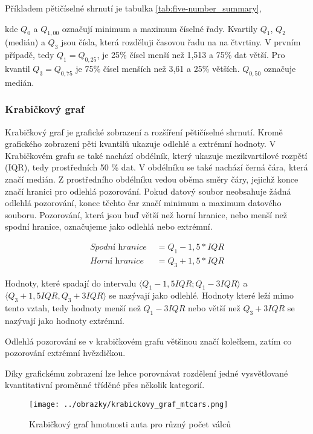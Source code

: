 Příkladem pětičíselné shrnutí je tabulka \ref{tab:five-number_summary},

kde $Q_{0}$ a $Q_{1,00}$ označují minimum a maximum číselné řady. Kvartily $Q_{1}$, $Q_{2}$ (medián) a $Q_{3}$ jsou čísla, která rozděluji časovou řadu na na čtvrtiny. V prvním
případě, tedy $Q_1 = Q_{0,25}$, je 25\% čísel menší než 1,513 a 75\% dat větší. Pro kvantil $Q_3 = Q_{0,75}$ je 75\% čísel menších než 3,61 a 25\% větších. $Q_{0,50}$ označuje medián.

\subsubsection{Krabičkový graf}
Krabičkový graf je grafické zobrazení a rozšíření pětičíselné shrnutí. Kromě grafického zobrazení 
pěti kvantilů  ukazuje odlehlé a extrémní hodnoty.
V Krabičkovém grafu se také nachází obdélník, který ukazuje mezikvartilové rozpětí (IQR), tedy prostředních 50 \% dat. V obdélníku se také nachází černá čára, která značí medián.
Z prostředního obdélníku vedou oběma směry čáry, jejichž konce značí hranici pro odlehlá pozorování. Pokud datový soubor neobsahuje žádná odlehlá pozorování, konec těchto čar
značí minimum a maximum datového souboru.
Pozorování, která jsou buď větší než horní hranice, nebo menší než spodní hranice, označujeme jako odlehlá nebo extrémní. 

\begin{align*}
    \textit{Spodní hranice } &= Q_1 - 1,5 * IQR \\
    \textit{Horní hranice } &= Q_3 + 1,5 * IQR
\end{align*}

Hodnoty, které spadají do intervalu $\langle Q_1 - 1,5IQR; Q_1 - 3IQR\rangle$ a $\langle Q_3 + 1,5IQR, Q_3 + 3IQR \rangle$ se nazývají jako odlehlé.
Hodnoty které leží mimo tento vztah, tedy hodnoty menší než $Q_1 - 3IQR$ nebo větší než $Q_3 + 3IQR$ se nazývají jako hodnoty extrémní.

Odlehlá pozorování se v krabičkovém grafu většinou značí kolečkem, zatím co pozorování extrémní hvězdičkou.

Díky grafickému zobrazení lze lehce porovnávat rozdělení jedné vysvětlované kvantitativní proměnné tříděné přes několik kategorií.

\begin{figure}[H]
    \centering
    \texttt{[image: ../obrazky/krabickovy\_graf\_mtcars.png]}
    \caption{Krabičkový graf hmotnosti auta pro různý počet válců} 
    \label{fig:krabickovy_graf_mtcars}
\end{figure}

